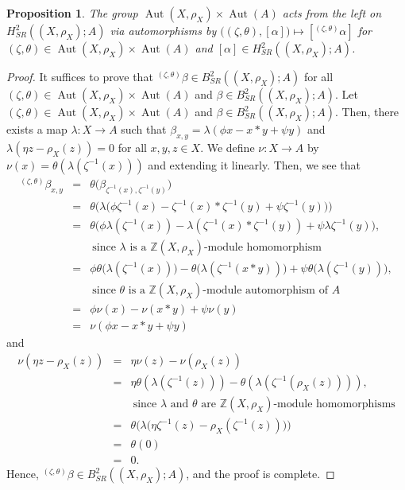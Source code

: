 \documentclass[11pt,reqno]{amsart}
\newtheorem{proposition}[theorem]{Proposition}
\theoremstyle{definition}
\numberwithin{equation}{subsection}
\begin{document}
\begin{proposition}
	The group $\operatorname{Aut}(X, \rho_{X}) \times \operatorname{Aut} (A)$ acts from the left on $H_{SR}^{2}((X, \rho_{X}); A)$ via automorphisms by $\big((\zeta,\theta), [\alpha] \big) \mapsto [{}^{(\zeta,\theta)}\alpha]$ for $(\zeta, \theta) \in \operatorname{Aut}(X, \rho_{X}) \times \operatorname{Aut}(A)$ and $[\alpha] \in H_{S R}^{2}((X,\rho_{X});A)$. 	
\end{proposition}

\begin{proof}
It suffices to prove that ${}^{(\zeta,\theta)}\beta \in B_{SR}^{2}((X, \rho_{X});A)$ for all $(\zeta,\theta) \in \operatorname{Aut}(X, \rho_{X}) \times \operatorname{Aut} (A)$ and $\beta \in B_{SR}^{2}((X, \rho_{X});A).$ Let  $(\zeta,\theta) \in \operatorname{Aut}(X, \rho_{X}) \times \operatorname{Aut} (A)$ and $\beta \in B_{SR}^{2}((X, \rho_{X});A)$. Then, there exists a map $\lambda:X\rightarrow A$ such that $\beta_{x,y}=\lambda(\phi x - x*y + \psi y)$ and $\lambda(\eta z - \rho_X(z))=0 $ for all $x, y, z \in X$. We define $\nu:X\rightarrow A $ by $\nu(x)=\theta(\lambda(\zeta^{-1}(x)))$ and extending it linearly.  Then, we see that
	\begin{eqnarray*}
 {}^{(\zeta,\theta)}\beta_{x, y} &=&\theta \big(\beta _{\zeta^{-1}(x),\zeta^{-1}(y)} \big) \\
		&= &\theta \big(\lambda \big(\phi\zeta^{-1}(x)-\zeta^{-1}(x)*\zeta^{-1}(y)+\psi\zeta^{-1}(y) \big)\big)\\
		&=& \theta\big(\phi\lambda(\zeta^{-1}(x))-\lambda(\zeta^{-1}(x)*\zeta^{-1}(y))+\psi\lambda\zeta^{-1}(y) \big),\\
		& & ~\textrm{since $\lambda$ is a $\mathbb{Z}(X, \rho_{X})$-module homomorphism}\\
		&=&\phi\theta \big(\lambda({\zeta^{-1}(x)})\big) - \theta \big(\lambda({\zeta^{-1}(x*y)})\big) +\psi\theta \big(\lambda({\zeta^{-1}(y)})\big),\\
		& & ~\textrm{since $\theta$ is a $\mathbb{Z}(X, \rho_{X})$-module automorphism of $A$} \\
		&=&\phi\nu(x)-\nu(x*y)+\psi\nu(y)\\ 
		&=&\nu(\phi x-x*y+\psi y)
	\end{eqnarray*}
and
\begin{eqnarray*}
		\nu(\eta z - \rho_X(z)) &=& \eta\nu(z) - \nu(\rho_X(z))\\
		&=&\eta\theta(\lambda(\zeta^{-1}(z))) - \theta(\lambda(\zeta^{-1}(\rho_X(z)))),\\
	& & ~\textrm{since $\lambda$ and $\theta$ are $\mathbb{Z}(X, \rho_{X})$-module homomorphisms}\\
		&=&\theta \big(\lambda \big(\eta\zeta^{-1}(z) - \rho_X(\zeta^{-1}(z)) \big)\big) \\
		&=&\theta(0)\\
		&=& 0.
	\end{eqnarray*}
	Hence, ${}^{(\zeta,\theta)}\beta \in B_{SR}^{2}((X, \rho_{X});A)$, and the proof is complete.
\end{proof}
\par
\end{document}
